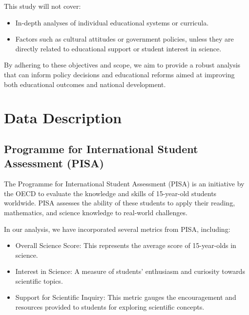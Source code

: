 \documentclass[12pt]{article}
\begin{document}
This study will not cover:

\begin{itemize}
\item In-depth analyses of individual educational systems or curricula.

\item Factors such as cultural attitudes or government policies, unless they are directly related to educational support or student interest in science.
\end{itemize}

By adhering to these objectives and scope, we aim to provide a robust analysis that can inform policy decisions and educational reforms aimed at improving both educational outcomes and national development.



\section{Data Description}

\subsection{Programme for International Student Assessment (PISA)}

The Programme for International Student Assessment (PISA) is an initiative by the OECD to evaluate the knowledge and skills of 15-year-old students worldwide. PISA assesses the ability of these students to apply their reading, mathematics, and science knowledge to real-world challenges.

In our analysis, we have incorporated several metrics from PISA, including:
\begin{itemize}
\item Overall Science Score: This represents the average score of 15-year-olds in science.
\item Interest in Science: A measure of students' enthusiasm and curiosity towards scientific topics.
\item Support for Scientific Inquiry: This metric gauges the encouragement and resources provided to students for exploring scientific concepts.
\end{itemize}
\end{document}
